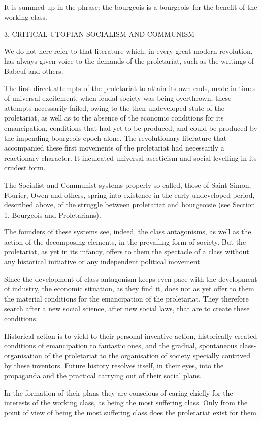 \documentclass[11pt]{book}
\begin{document}
It is summed up in the phrase: the bourgeois is a bourgeois--for
the benefit of the working class.


3.  CRITICAL-UTOPIAN SOCIALISM AND COMMUNISM

We do not here refer to that literature which, in every great
modern revolution, has always given voice to the demands of the
proletariat, such as the writings of Babeuf and others.

The first direct attempts of the proletariat to attain its own
ends, made in times of universal excitement, when feudal society
was being overthrown, these attempts necessarily failed, owing
to the then undeveloped state of the proletariat, as well as to
the absence of the economic conditions for its emancipation,
conditions that had yet to be produced, and could be produced
by the impending bourgeois epoch alone. The revolutionary
literature that accompanied these first movements of the
proletariat had necessarily a reactionary character. It
inculcated universal asceticism and social levelling in its
crudest form.

The Socialist and Communist systems properly so called, those of
Saint-Simon, Fourier, Owen and others, spring into existence in
the early undeveloped period, described above, of the struggle
between proletariat and bourgeoisie (see Section 1. Bourgeois
and Proletarians).

The founders of these systems see, indeed, the class antagonisms, as
well as the action of the decomposing elements, in the prevailing form
of society. But the proletariat, as yet in its infancy, offers to them
the spectacle of a class without any historical initiative or any
independent political movement.

Since the development of class antagonism keeps even pace with
the development of industry, the economic situation, as they find
it, does not as yet offer to them the material conditions for the
emancipation of the proletariat.  They therefore search after a
new social science, after new social laws, that are to create
these conditions.

Historical action is to yield to their personal inventive
action, historically created conditions of emancipation to
fantastic ones, and the gradual, spontaneous class-organisation
of the proletariat to the organisation of society specially
contrived by these inventors.  Future history resolves itself, in
their eyes, into the propaganda and the practical carrying out of
their social plans.

In the formation of their plans they are conscious of caring
chiefly for the interests of the working class, as being the most
suffering class.  Only from the point of view of being the most
suffering class does the proletariat exist for them.
\end{document}
